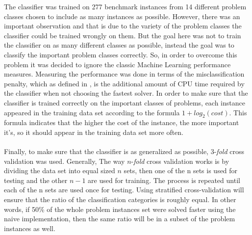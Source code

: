 The classifier was trained on 277 benchmark instances from 14 different problem classes chosen to include as many instances as possible. However, there was an important observation and that is due to the variety of the problem classes the classifier could be trained wrongly on them. But the goal here was not to train the classifier on as many different classes as possible, instead the goal was to classify the important problem classes correctly. So, in order to overcome this problem it was decided to ignore the classic Machine Learning performance measures. Measuring the performance was done in terms of the misclassification penalty, which as defined in \cite{ml:csd}, is the additional amount of CPU time required by the classifier when not choosing the fastest solver. In order to make sure that the classifier is trained correctly on the important classes of problems, each instance appeared in the training data set according to the formula $1 + log_{2}(cost)$. This formula indicates that the higher the cost of the instance, the more important it's, so it should appear in the training data set more often.
\\\\
Finally, to make sure that the classifier is as generalized as possible, $3$-\textit{fold} cross validation was used. Generally, The way $n$-\textit{fold} cross validation works is by dividing the data set into equal sized $n$ sets, then one of the n sets is used for testing and the other $n-1$ are used for training. The process is repeated until each of the n sets are used once for testing. Using stratified cross-validation will ensure that the ratio of the classification categories is roughly equal. In other words, if 50\% of the whole problem instances set were solved faster using the naive implementation, then the same ratio will be in a subset of the problem instances as well.

